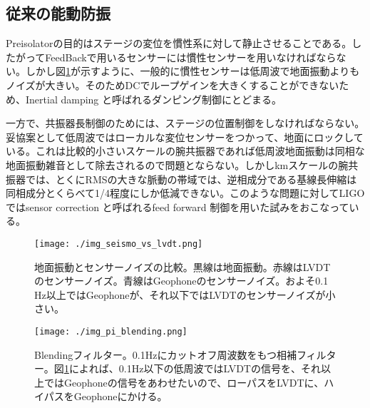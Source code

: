 \documentclass[a4paper,12pt]{jsarticle}
\begin{document}
\subsection{従来の能動防振}

Preisolatorの目的はステージの変位を慣性系に対して静止させることである。したがってFeedBackで用いるセンサーには慣性センサーを用いなければならない。しかし図\ref{img:img_seismo_vs_lvdt}が示すように、一般的に慣性センサーは低周波で地面振動よりもノイズが大きい。そのためDCでループゲインを大きくすることができないため、Inertial damping と呼ばれるダンピング制御にとどまる。

一方で、共振器長制御のためには、ステージの位置制御をしなければならない。妥協案として低周波ではローカルな変位センサーをつかって、地面にロックしている。これは比較的小さいスケールの腕共振器であれば低周波地面振動は同相な地面振動雑音として除去されるので問題とならない。しかしkmスケールの腕共振器では、とくにRMSの大きな脈動の帯域では、逆相成分である基線長伸縮は同相成分とくらべて1/4程度にしか低減できない。このような問題に対してLIGOではsensor correction と呼ばれるfeed forward 制御を用いた試みをおこなっている\cite{matichard2015seismic}。

\begin{figure}[H]
  \begin{center}
    \texttt{[image: ./img\_seismo\_vs\_lvdt.png]}
  \end{center}
  \caption{地面振動とセンサーノイズの比較。黒線は地面振動。赤線はLVDTのセンサーノイズ。青線はGeophoneのセンサーノイズ。およそ0.1 Hz以上ではGeophoneが、それ以下ではLVDTのセンサーノイズが小さい。}
  \label{img:img_seismo_vs_lvdt}
\end{figure}


\begin{figure}[H]
  \begin{center}
    \texttt{[image: ./img\_pi\_blending.png]}
  \end{center}
  \caption{Blendingフィルター。0.1Hzにカットオフ周波数をもつ相補フィルター。図\ref{img:img_seismo_vs_lvdt}によれば、0.1Hz以下の低周波ではLVDTの信号を、それ以上ではGeophoneの信号をあわせたいので、ローパスをLVDTに、ハイパスをGeophoneにかける。}
  \label{img:img_pi_blending}
\end{figure}
\end{document}

